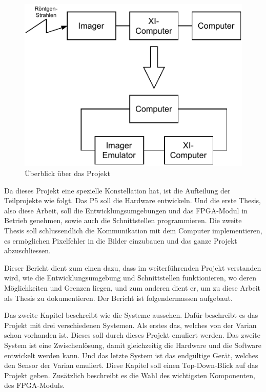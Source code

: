 \documentclass{article}
\begin{document}
\begin{figure}[tb]
    \includegraphics[width=\linewidth]{drawio/bd_sehr_grob}
    \caption{Überblick über das Projekt}
    \label{fig:bd_sehr_grob}
\end{figure}

Da dieses Projekt eine spezielle Konstellation hat, ist die Aufteilung der Teilprojekte wie folgt. Das P5 soll die Hardware entwickeln. Und die erste Thesis, also diese Arbeit, soll die Entwicklungsumgebungen und das FPGA-Modul in Betrieb genehmen, sowie auch die Schnittstellen programmieren. Die zweite Thesis soll schlussendlich die Kommunikation mit dem Computer implementieren, es ermöglichen Pixelfehler in die Bilder einzubauen und das ganze Projekt abzuschliessen.

Dieser Bericht dient zum einen dazu, dass im weiterführenden Projekt verstanden wird, wie die Entwicklungsumgebung und Schnittstellen funktionieren, wo deren Möglichkeiten und Grenzen liegen, und zum anderen dient er, um zu diese Arbeit als Thesis zu dokumentieren. Der Bericht ist folgendermassen aufgebaut.

Das zweite Kapitel beschreibt wie die Systeme aussehen. Dafür beschreibt es das Projekt mit drei verschiedenen Systemen. Als erstes das, welches von der Varian schon vorhanden ist. Dieses soll durch dieses Projekt emuliert werden. Das zweite System ist eine Zwischenlösung, damit gleichzeitig die Hardware und die Software entwickelt werden kann. Und das letzte System ist das endgültige Gerät, welches den Sensor der Varian emuliert. Diese Kapitel soll einen Top-Down-Blick auf das Projekt geben. Zusätzlich beschreibt es die Wahl des wichtigsten Komponenten, des FPGA-Moduls.
\end{document}
